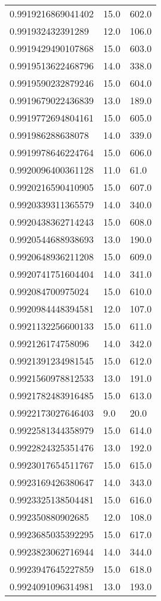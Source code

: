 \begin{center}
\begin{supertabular}[H]{p{0.30\textwidth}p{0.05\textwidth}p{0.05\textwidth}}
0.9919216869041402 & 15.0 & 602.0 \\ 
0.991932432391289 & 12.0 & 106.0 \\ 
0.9919429490107868 & 15.0 & 603.0 \\ 
0.9919513622468796 & 14.0 & 338.0 \\ 
0.9919590232879246 & 15.0 & 604.0 \\ 
0.9919679022436839 & 13.0 & 189.0 \\ 
0.9919772694804161 & 15.0 & 605.0 \\ 
0.991986288638078 & 14.0 & 339.0 \\ 
0.9919978646224764 & 15.0 & 606.0 \\ 
0.9920096400361128 & 11.0 & 61.0 \\ 
0.9920216590410905 & 15.0 & 607.0 \\ 
0.9920339311365579 & 14.0 & 340.0 \\ 
0.9920438362714243 & 15.0 & 608.0 \\ 
0.9920544688938693 & 13.0 & 190.0 \\ 
0.9920648936211208 & 15.0 & 609.0 \\ 
0.9920741751604404 & 14.0 & 341.0 \\ 
0.992084700975024 & 15.0 & 610.0 \\ 
0.9920984448394581 & 12.0 & 107.0 \\ 
0.9921132256600133 & 15.0 & 611.0 \\ 
0.992126174758096 & 14.0 & 342.0 \\ 
0.9921391234981545 & 15.0 & 612.0 \\ 
0.9921560978812533 & 13.0 & 191.0 \\ 
0.9921782483916485 & 15.0 & 613.0 \\ 
0.9922173027646403 & 9.0 & 20.0 \\ 
0.9922581344358979 & 15.0 & 614.0 \\ 
0.9922824325351476 & 13.0 & 192.0 \\ 
0.9923017654511767 & 15.0 & 615.0 \\ 
0.9923169426380647 & 14.0 & 343.0 \\ 
0.9923325138504481 & 15.0 & 616.0 \\ 
0.992350880902685 & 12.0 & 108.0 \\ 
0.9923685035392295 & 15.0 & 617.0 \\ 
0.9923823062716944 & 14.0 & 344.0 \\ 
0.9923947645227859 & 15.0 & 618.0 \\ 
0.9924091096314981 & 13.0 & 193.0 \\ 

\end{supertabular}
\end{center}
